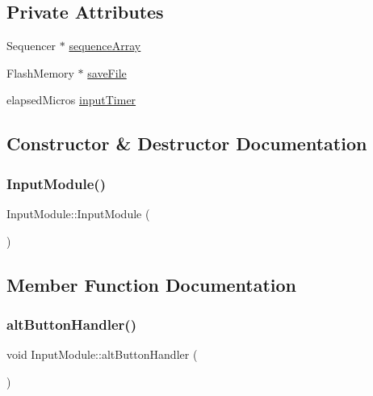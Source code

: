 \subsection*{Private Attributes}
\begin{DoxyCompactItemize}
\item 
Sequencer $\ast$ \hyperlink{class_input_module_afdc54a8219ed5b5743201a00efd2cb72}{sequence\+Array}
\item 
Flash\+Memory $\ast$ \hyperlink{class_input_module_a0a4fbca5f978a217f47ed31082eaaecc}{save\+File}
\item 
elapsed\+Micros \hyperlink{class_input_module_ae0efc931ea904dda2e5b29f8c20181eb}{input\+Timer}
\end{DoxyCompactItemize}


\subsection{Constructor \& Destructor Documentation}
\mbox{\label{class_input_module_a158c97df320462df4e6986be5a2b2646}} 
\subsubsection{\texorpdfstring{Input\+Module()}{InputModule()}}
{\footnotesize\ttfamily Input\+Module\+::\+Input\+Module (\begin{DoxyParamCaption}{ }\end{DoxyParamCaption})}



\subsection{Member Function Documentation}
\mbox{\label{class_input_module_a1f93d0b1fc3269147f4d03a888ddb631}} 
\subsubsection{\texorpdfstring{alt\+Button\+Handler()}{altButtonHandler()}}
{\footnotesize\ttfamily void Input\+Module\+::alt\+Button\+Handler (\begin{DoxyParamCaption}{ }\end{DoxyParamCaption})}

